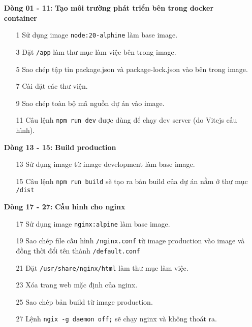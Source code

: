 \begin{itemize}[label={--}]
        \begin{itemize}
          \item[\bfseries Dòng 01 - 11:] \textbf{Tạo môi trường phát triển bên trong docker container}
            \begin{itemize}
              \item[1] Sử dụng image \texttt{node:20-alphine} làm base image.
              \item[3] Đặt \texttt{/app} làm thư mục làm việc bên trong image.
              \item[5] Sao chép tập tin package.json và package-lock.json vào bên trong image.
              \item[7] Cài đặt các thư viện.
              \item[9] Sao chép toàn bộ mã nguồn dự án vào image.
              \item[11] Câu lệnh \texttt{npm run dev} được dùng để chạy dev server (do Vitejs cấu hình).
            \end{itemize}
          \item[\bfseries Dòng 13 - 15:] \textbf{Build production}
            \begin{itemize}
              \item[13] Sử dụng image từ image development làm base image.
              \item[15] Câu lệnh \texttt{npm run build} sẽ tạo ra bản build của dự án nằm ở thư mục \texttt{/dist}
            \end{itemize}
          \item[\bfseries Dòng 17 - 27:] \textbf{Cấu hình cho nginx}
            \begin{itemize}
              \item[17] Sử dụng image \texttt{nginx:alpine} làm base image.
              \item[19] Sao chép file cấu hình \texttt{/nginx.conf} từ image production vào image và đồng thời đổi tên thành \texttt{/default.conf}
              \item[21] Đặt \texttt{/usr/share/nginx/html} làm thư mục làm việc.
              \item[23] Xóa trang web mặc định của nginx.
              \item[25] Sao chép bản build từ image production.
              \item[27] Lệnh \texttt{ngix -g daemon off;} sẽ chạy nginx và không thoát ra.
            \end{itemize}
        \end{itemize}


\end{itemize}
